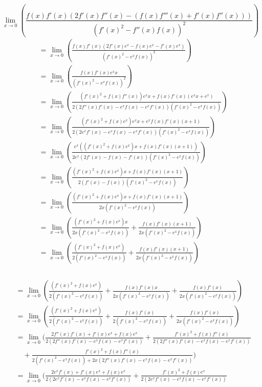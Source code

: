 \documentclass{article}
\begin{document}
\begin{enumerate}[label=\alph*.)]
\[
\lim_{x \rightarrow 0}(\frac{f(x)f'(x)(2f'(x)f''(x) - (f(x)f'''(x) + f'(x)f''(x)))}{(f'(x)^2 - f''(x)f(x))^2})
\]
\begin{align*}
&=\lim_{x \rightarrow 0}(\frac{f(x)f'(x)(2f'(x)e^x - f(x)e^x - f'(x)e^x)}{(f'(x)^2 - e^xf(x))^2})\\
&= \lim_{x \rightarrow 0}(\frac{f(x)f'(x)e^xx}{(f'(x)^2 - e^xf(x))^2})\\
&= \lim_{x \rightarrow 0}(\frac{(f'(x)^2 + f(x)f''(x))e^xx + f(x)f'(x)(e^xx + e^x)}{2(2f''(x)f'(x) - e^xf(x) - e^xf'(x))(f'(x)^2 - e^xf(x))})\\
&= \lim_{x \rightarrow 0}(\frac{(f'(x)^2 + f(x)e^x)e^xx + e^xf(x)f'(x)(x + 1)}{2(2e^xf'(x) - e^xf(x) - e^xf'(x))(f'(x)^2 - e^xf(x))})\\
&= \lim_{x \rightarrow 0}(\frac{e^x((f'(x)^2 + f(x)e^x)x + f(x)f'(x)(x + 1))}{2e^x(2f'(x) - f(x) - f'(x))(f'(x)^2 - e^xf(x))})\\
&= \lim_{x \rightarrow 0}(\frac{(f'(x)^2 + f(x)e^x)x + f(x)f'(x)(x + 1)}{2(f'(x) - f(x))(f'(x)^2 - e^xf(x))})\\
&= \lim_{x \rightarrow 0}(\frac{(f'(x)^2 + f(x)e^x)x + f(x)f'(x)(x + 1)}{2x(f'(x)^2 - e^xf(x))})\\
&= \lim_{x \rightarrow 0}(\frac{(f'(x)^2 + f(x)e^x)x}{2x(f'(x)^2 - e^xf(x))} + \frac{f(x)f'(x)(x + 1)}{2x(f'(x)^2 - e^xf(x))})\\
&= \lim_{x \rightarrow 0}(\frac{(f'(x)^2 + f(x)e^x)}{2(f'(x)^2 - e^xf(x))} + \frac{f(x)f'(x)(x + 1)}{2x(f'(x)^2 - e^xf(x))})\\
\end{align*}\\
\begin{align*}
&= \lim_{x \rightarrow 0}(\frac{(f'(x)^2 + f(x)e^x)}{2(f'(x)^2 - e^xf(x))} + \frac{f(x)f'(x)x}{2x(f'(x)^2 - e^xf(x))} +\frac{f(x)f'(x)}{2x(f'(x)^2 - e^xf(x))} )\\
&= \lim_{x \rightarrow 0}(\frac{(f'(x)^2 + f(x)e^x)}{2(f'(x)^2 - e^xf(x))} + \frac{f(x)f'(x)}{2(f'(x)^2 - e^xf(x))} +\frac{f(x)f'(x)}{2x(f'(x)^2 - e^xf(x))} )\\
&= \lim_{x \rightarrow 0}(\frac{2f''(x)f'(x) + f'(x)e^x + f(x)e^x}{2(2f''(x)f'(x) - e^xf(x) - e^xf'(x))} + \frac{f'(x)^2 + f(x)f''(x)}{2(2f''(x)f'(x) - e^xf(x) - e^xf'(x))} \\
&\quad +\frac{f'(x)^2 + f(x)f''(x)}{2(f'(x)^2 -e^xf(x)) + 2x(2f''(x)f'(x) - e^xf(x) - e^xf'(x))} )\\
&= \lim_{x \rightarrow 0}(\frac{2e^xf'(x) + f'(x)e^x + f(x)e^x}{2(2e^xf'(x) - e^xf(x) - e^xf'(x))} + \frac{f'(x)^2 + f(x)e^x}{2(2e^xf'(x) - e^xf(x) - e^xf'(x))} \\

\end{align*}
\end{enumerate}
\end{document}
